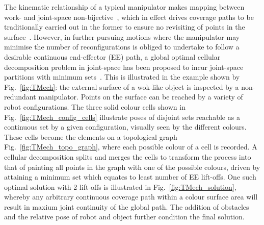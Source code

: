 \documentclass[Afour,sageh,times]{sagej}
\begin{document}
The kinematic relationship of a typical manipulator makes mapping between work- and joint-space non-bijective~\cite{lavalle2006planning}, which in effect drives coverage paths to be traditionally carried out in the former to ensure no revisiting of points in the surface~\cite{Oriolo2005Motion}. 
However, in further pursuing motions where the manipulator may minimise the number of reconfigurations is obliged to undertake to follow a desirable continuous end-effector (EE) path, a global optimal cellular decomposition problem in joint-space has been 
proposed to incur joint-space partitions with minimum sets~\cite{Yang2020Cellular}. 
This is illustrated in the example shown by Fig.~\ref{fig:TMech}: the external surface of a wok-like object is inspected by a non-redundant manipulator. 
Points on the surface can be reached by a variety of robot configurations. 
The three solid colour cells shown in Fig.~\ref{fig:TMech_config_cells} illustrate poses of disjoint sets reachable as a continuous set by a given configuration, visually seen by the different colours. 
These cells become the elements on a topological graph Fig.~\ref{fig:TMech_topo_graph}, where each possible colour of a cell is recorded. 
A cellular decomposition splits and merges the cells to transform the process into that of painting all points in the graph with one of the possible colours, driven by attaining a minimum set which equates to least number of EE lift-offs. 
One such optimal solution with 2 lift-offs is illustrated in Fig.~\ref{fig:TMech_solution}, 
whereby any arbitrary continuous coverage path within a colour surface area will result in maxium joint continuity of the global path. 
The addition of obstacles and the relative pose of robot and object further condition the final solution. 
\end{document}
